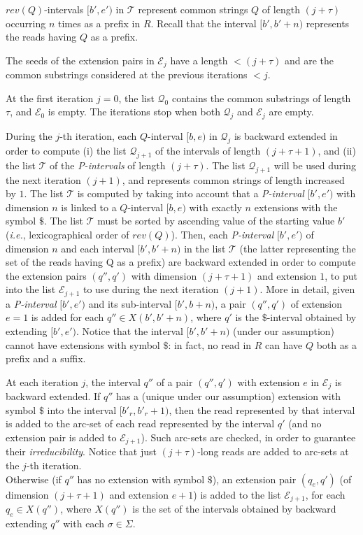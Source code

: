 \documentclass[runningheads,envcountsame,a4paper]{llncs}
\newcommand{\ie}{\textit{i.e.},\xspace}
\begin{document}
$rev(Q)$-intervals $[b',e')$ in $\mathcal{T}$ represent common strings $Q$ of length $(j+\tau)$ occurring $n$ times as a prefix in $R$. Recall that the interval $[b',b'+n)$ represents the reads having $Q$ as a prefix.

The seeds of the extension pairs in $\mathcal{E}_j$
have a length $< (j+\tau)$ and are the common substrings considered at the previous iterations $< j$.

At the first iteration $j=0$, the list $\mathcal{Q}_0$ contains the common substrings of length $\tau$, and $\mathcal{E}_0$ is empty. The iterations stop when both $\mathcal{Q}_j$ and $\mathcal{E}_j$ are empty.

During the $j$-th iteration, each $Q$-interval $[b, e)$ in $\mathcal{Q}_j$ is backward extended in order to compute (i) the list $\mathcal{Q}_{j+1}$ of the intervals of length $(j+\tau+1)$, and (ii) the list $\mathcal{T}$ of the \emph{P-intervals} of length $(j+\tau)$.
The list $\mathcal{Q}_{j+1}$ will be used during the next iteration $(j+1)$, and represents common strings of length increased by $1$. The list $\mathcal{T}$ is computed by taking into account that a \emph{P-interval} $[b', e')$ with dimension $n$ is linked to a $Q$-interval $[b, e)$ with exactly $n$ extensions with the symbol $\$$.
The list $\mathcal{T}$ must be sorted by ascending value of the starting value $b'$ (\ie lexicographical order of $rev(Q)$). Then, each \emph{P-interval} $[b', e')$ of dimension $n$ and each interval $[b', b'+n)$ in the list $\mathcal{T}$ (the latter representing the set of the reads having Q as a prefix) are backward extended in order to compute the extension pairs $(q'', q')$ with dimension $(j+\tau+1)$ and extension $1$, to put into the list $\mathcal{E}_{j+1}$ to use during the next iteration $(j+1)$. More in detail, given a \emph{P-interval} $[b',e')$ and its sub-interval $[b',b+n)$, a pair $(q'',q')$ of extension $e=1$ is added for each $q'' \in X(b',b'+n)$, where $q'$ is the $\$$-interval obtained by extending $[b',e')$. Notice that the interval $[b', b'+n)$ (under our assumption) cannot have extensions with symbol $\$$: in fact, no read in $R$ can have $Q$ both as a prefix and a suffix.

At each iteration $j$, the interval $q''$ of a pair $(q'', q')$ with extension $e$ in $\mathcal{E}_j$ is backward extended. If $q''$ has a (unique under our assumption) extension with symbol $\$$ into the interval $[b'_r, b'_r+1)$, then the read represented by that interval is added to the arc-set of each read represented by the interval $q'$ (and no extension pair is added to $\mathcal{E}_{j+1}$). Such arc-sets are checked, in order to guarantee their \emph{irreducibility}. Notice that just $(j+\tau)$-long reads are added to arc-sets at the $j$-th iteration.\\
Otherwise (if $q''$ has no extension with symbol $\$$), an extension pair $(q_e, q')$ (of dimension $(j+\tau+1)$ and extension $e+1$) is added to the list $\mathcal{E}_{j+1}$, for each $q_e \in X(q'')$, where $X(q'')$ is the set of the intervals obtained by backward extending $q''$ with each $\sigma \in \Sigma$.
\end{document}

